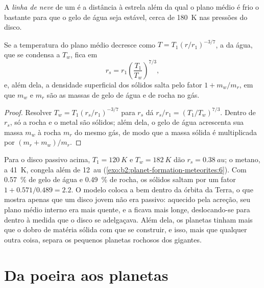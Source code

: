 \begin{definition}\label{def:b2:planet-formation-meteorites:snow-line}
A \emph{linha de neve} de um  é a distância
à estrela além da qual o plano médio é frio o bastante para que o gelo de água seja
estável, cerca de \qty{180}{K} nas pressões do disco.
\end{definition}

\begin{proposition}
\label{prop:b2:planet-formation-meteorites:snow-line}
Se a temperatura do plano médio decresce como $T = T_1 (r/r_1)^{-3/7}$, a 
da água, que se condensa a $T_w$, fica em
\[
  r_s = r_1 \left(\frac{T_1}{T_w}\right)^{7/3},
\]
e, além dela, a densidade superficial dos sólidos salta pelo fator $1 + m_w/m_r$,
em que $m_w$ e $m_r$ são as massas de gelo de água e de rocha no gás.
\end{proposition}

\begin{proof}
Resolver $T_w = T_1 (r_s/r_1)^{-3/7}$ para $r_s$ dá
$r_s/r_1 = (T_1/T_w)^{7/3}$. Dentro de $r_s$, só a rocha e o metal são sólidos; além
dela, o gelo de água acrescenta sua massa $m_w$ à rocha $m_r$ do mesmo gás, de modo que a
massa sólida é multiplicada por $(m_r + m_w)/m_r$.
\end{proof}

Para o disco passivo acima, $T_1 = \qty{120}{K}$ e $T_w = \qty{182}{K}$ dão
$r_s = \qty{0.38}{au}$; o metano, a \qty{41}{K}, congela além de \qty{12}{au}
(\cref{exo:b2:planet-formation-meteorites:6}). Com \qty{0.57}{\percent} de gelo de água e \qty{0.49}{\percent}
de rocha, os sólidos saltam por um fator $1 + 0.571/0.489 = 2.2$. O modelo
coloca a  bem dentro da órbita da Terra, o que mostra apenas que um
disco jovem não era passivo: aquecido pela acreção, seu plano médio interno era mais quente,
e a  ficava mais longe, deslocando-se para dentro à medida que o disco se adelgaçava. Além
dela, os planetas tinham mais que o dobro de matéria sólida com que se construir, e
isso, mais que qualquer outra coisa, separa os pequenos planetas rochosos dos
gigantes.

\section{Da poeira aos planetas}


